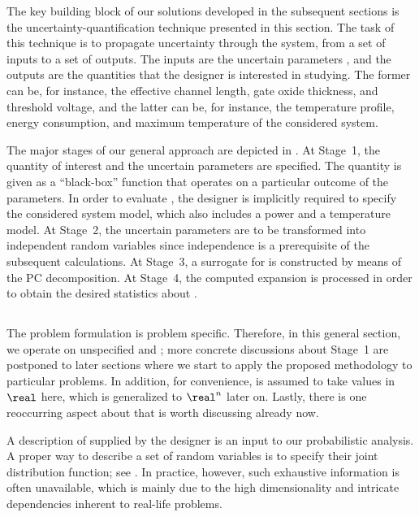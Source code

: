 The key building block of our solutions developed in the subsequent sections is
the uncertainty-quantification technique presented in this section. The task of
this technique is to propagate uncertainty through the system, from a set of
inputs to a set of outputs. The inputs are the uncertain parameters \vu, and the
outputs are the quantities that the designer is interested in studying. The
former can be, for instance, the effective channel length, gate oxide thickness,
and threshold voltage, and the latter can be, for instance, the temperature
profile, energy consumption, and maximum temperature of the considered system.

The major stages of our general approach are depicted in .
At Stage~1, the quantity of interest \g and the uncertain parameters \vu are
specified. The quantity is given as a ``black-box'' function that operates on a
particular outcome of the parameters. In order to evaluate \g, the designer is
implicitly required to specify the considered system model, which also includes
a power and a temperature model. At Stage~2, the uncertain parameters \vu are to
be transformed into independent random variables \vz since independence is a
prerequisite of the subsequent calculations. At Stage~3, a surrogate for \g is
constructed by means of the \ac{PC} decomposition. At Stage~4, the computed
expansion is processed in order to obtain the desired statistics about \g.

\subsection{\problemtitle}

The problem formulation is problem specific. Therefore, in this general section,
we operate on unspecified \g and \vu; more concrete discussions about Stage~1
are postponed to later sections where we start to apply the proposed methodology
to particular problems. In addition, for convenience, \g is assumed to take
values in $\real$ here, which is generalized to $\real^n$ later on. Lastly,
there is one reoccurring aspect about \vu that is worth discussing already now.

A description of \vu supplied by the designer is an input to our probabilistic
analysis. A proper way to describe a set of random variables is to specify their
joint distribution function; see . In practice,
however, such exhaustive information is often unavailable, which is mainly due
to the high dimensionality and intricate dependencies inherent to real-life
problems.

